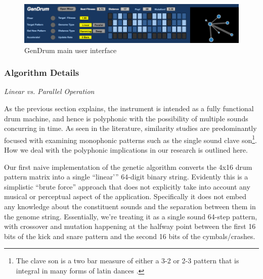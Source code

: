 \begin{figure}
	\begin{center}
		\includegraphics[width=\figSizeHundred]{ch03_symbolic/figures/gendrum.png}
	\end{center}
	\caption[GenDrum main user interface]{GenDrum main user interface}
	\label{fig:gendrum}
\end{figure} 

\subsubsection*{Algorithm Details}

\textit{Linear vs. Parallel Operation}

As the previous section explains, the instrument is intended as a fully functional drum machine, and hence is polyphonic with the possibility of multiple sounds concurring in time. As seen in the literature, similarity studies are predominantly focused with examining monophonic patterns such as the single sound clave son\footnote{The clave son is a two bar measure of either a 3-2 or 2-3 pattern that is integral in many forms of latin dances \citep{Sethares2007}.}. How we deal with the polyphonic implications in our research is outlined here.

Our first naive implementation of the genetic algorithm converts the 4x16 drum pattern matrix into a single “linear'” 64-digit binary string. Evidently this is a simplistic ``brute force'' approach that does not explicitly take into account any musical or perceptual aspect of the application. Specifically it does not embed any knowledge about the constituent sounds and the separation between them in the genome string. Essentially, we’re treating it as a single sound 64-step pattern, with crossover and mutation happening at the halfway point between the first 16 bits of the kick and snare pattern and the second 16 bits of the cymbals/crashes. 

